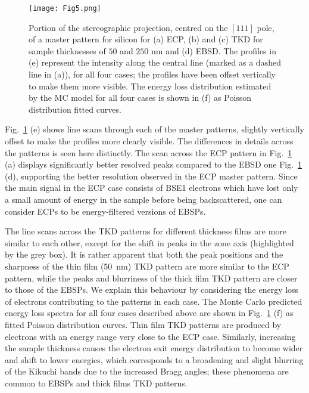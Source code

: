 \begin{figure}[ht]
\centering
\texttt{[image: Fig5.png]}%
\caption[(a) ECP, (b) and  (c) TKD for sample thicknesses of $50$ and $250$ nm and (d) EBSD]{Portion of the stereographic projection, centred on the $[111]$ pole, of a master pattern for silicon for (a) ECP, (b) and  (c) TKD for sample thicknesses of $50$ and $250$ nm and (d) EBSD. The profiles in (e) represent the intensity along the central line (marked as a dashed line in (a)), for all four cases; the profiles have been offset vertically to make them more visible. The energy loss distribution estimated by the MC model for all four cases is shown in (f) as Poisson distribution fitted curves. }
\label{fig:MPs}
\end{figure}

Fig.~\ref{fig:MPs} (e) shows line scans through each of the master patterns, slightly vertically offset to make the profiles more clearly visible. The differences in details across the patterns is seen here distinctly. The scan across the ECP pattern in Fig.~\ref{fig:MPs} (a) displays significantly better resolved peaks compared to the EBSD one Fig.~\ref{fig:MPs} (d), supporting the better resolution observed in the ECP master pattern. Since the main signal in the ECP case consists of BSE1 electrons which have lost only a small amount of energy in the sample before being backscattered, one can consider ECPs to be energy-filtered versions of EBSPs.


The line scans across the TKD patterns for different thickness films are more similar to each other, except for the shift in peaks in the zone axis (highlighted by the grey box). It is rather apparent that both the peak positions and the sharpness of the thin film (50~nm) TKD pattern are more similar to the ECP pattern, while the peaks and blurriness of the thick film TKD pattern are closer to those of the EBSPs. We explain this behaviour by considering the energy loss of electrons contributing to the patterns in each case. The Monte Carlo predicted energy loss spectra for all four cases described above are shown in Fig.~\ref{fig:MPs} (f) as fitted Poisson distribution curves. Thin film TKD patterns are produced by electrons with an energy range very close to the ECP case. Similarly, increasing the sample thickness causes the electron exit energy distribution to become wider and shift to lower energies, which corresponds to a broadening and slight blurring of the Kikuchi bands due to the increased Bragg angles; these phenomena are common to EBSPs and thick films TKD patterns. 


